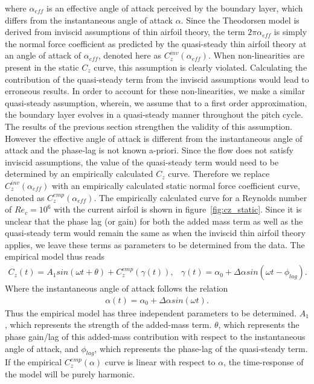 where $\alpha_{eff}$ is an effective angle of attack perceived by the boundary layer, which differs from the instantaneous angle of attack $\alpha$. Since the Theodorsen model is derived from inviscid assumptions of thin airfoil theory, the term $2\pi\alpha_{eff}$ is simply the normal force coefficient as predicted by the quasi-steady thin airfoil theory at an angle of attack of $\alpha_{eff}$, denoted here as $C_{z}^{inv}(\alpha_{eff})$. When non-linearities are present in the static $C_{z}$ curve, this assumption is clearly violated. Calculating the contribution of the quasi-steady term from the inviscid assumptions would lead to erroneous results. In order to account for these non-linearities, we make a similar quasi-steady assumption, wherein, we assume that to a first order approximation, the boundary layer evolves in a quasi-steady manner throughout the pitch cycle. The results of the previous section strengthen the validity of this assumption. However the effective angle of attack is different from the instantaneous angle of attack and the phase-lag is not known a-priori. Since the flow does not satisfy inviscid assumptions, the value of the quasi-steady term would need to be determined by an empirically calculated $C_{z}$ curve. Therefore we replace $C^{inv}_{z}(\alpha_{eff})$ with an empirically calculated static normal force coefficient curve, denoted as $C^{emp}_{z}(\alpha_{eff})$. The empirically calculated curve for a Reynolds number of $Re_{c}=10^{6}$ with the current airfoil is shown in figure~\ref{fig:cz_static}. Since it is unclear that the phase lag (or gain) for both the added mass term as well as the quasi-steady term would remain the same as when the inviscid thin airfoil theory applies, we leave these terms as parameters to be determined from the data. The empirical model thus reads
\begin{subequations}
	\begin{align}
		\label{eqn:phase_lag_cz}
		C_{z}(t) = A_{1}sin(\omega t + \theta) + C^{emp}_{z}(\gamma(t)),
	\end{align}
	\begin{align}
		\label{eqn:effective_alpha}	
		\gamma(t) = \alpha_{0} + \Delta\alpha sin(\omega t - \phi_{lag}).
	\end{align}
		\label{eqn:phase_lag_model}	
\end{subequations}
Where the instantaneous angle of attack follows the relation
\begin{align}
	\alpha(t) = \alpha_{0} + \Delta\alpha sin(\omega t).
\end{align}
Thus the empirical model has three independent parameters to be determined. $A_{1}$, which represents the strength of the added-mass term. $\theta$, which represents the phase gain/lag of this added-mass contribution with respect to the instantaneous angle of attack, and $\phi_{lag}$, which represents the phase-lag of the quasi-steady term. If the empirical $C^{emp}_{z}(\alpha)$ curve is linear with respect to $\alpha$, the time-response of the model will be purely harmonic.

